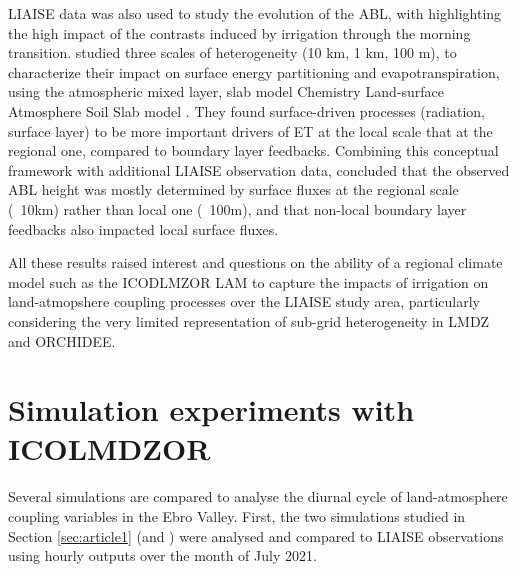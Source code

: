 LIAISE data was also used to study the evolution of the ABL, with \citet{brooke_irrigation_2023} highlighting the high impact of the contrasts induced by irrigation through the morning transition. 
\citet{mangan_evapotranspiration_2023} studied three scales of heterogeneity (10 km, 1 km, 100 m), to characterize their impact on surface energy partitioning and evapotranspiration, using the atmospheric mixed layer, slab model Chemistry Land-surface Atmosphere Soil Slab model \citep[CLASS, \url{https://classmodel.github.io/}][]{arellano_atmospheric_2015}. They found surface-driven processes (radiation, surface layer) to be more important drivers of ET at the local scale that at the regional one, compared to boundary layer feedbacks. 
Combining this conceptual framework with additional LIAISE observation data, \citet{mangan_surface-boundary_2023} concluded that the observed ABL height was mostly determined by surface fluxes at the regional scale (~10km) rather than local one (~100m), and that non-local boundary layer feedbacks also impacted local surface fluxes.

\hfill

All these results raised interest and questions on the ability of a regional climate model such as the ICODLMZOR LAM to capture the impacts of irrigation on land-atmopshere coupling processes over the LIAISE study area, particularly considering the very limited representation of sub-grid heterogeneity in LMDZ and ORCHIDEE.

\clearpage

\section{Simulation experiments with ICOLMDZOR}

Several simulations are compared to analyse the diurnal cycle of land-atmosphere coupling variables in the Ebro Valley.
First, the two simulations studied in Section \ref{sec:article1} (\noirr and \irr) were analysed and compared to LIAISE observations using hourly outputs over the month of July 2021.

